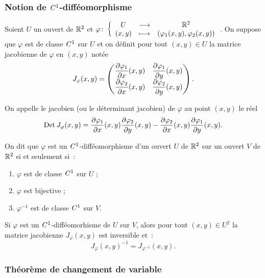 \subsubsection{Notion de $\mathit{C}^1$-difféomorphisme}

\begin{defdef}
  Soient $U$ un ouvert de $\mathbb{R}^2$ et $\varphi\colon \left\{\begin{array}{ccc} U & \longrightarrow &\mathbb{R}^2\\ (x,y) & \longmapsto & (\varphi_1(x,y),\varphi_2(x,y)) \end{array} \right.$. On suppose que $\varphi$ est de classe $\mathit{C}^1$ sur $U$ et on définit pour tout $(x,y) \in U$ la matrice jacobienne de $\varphi$ en $(x,y)$ notée
  \begin{equation}
    J_\varphi(x,y) = \begin{pmatrix} \dfrac{\partial \varphi_1}{\partial x}(x,y) & \dfrac{\partial \varphi_1}{\partial y}(x,y) \\ \dfrac{\partial \varphi_2}{\partial x}(x,y) & \dfrac{\partial \varphi_2}{\partial y}(x,y) \end{pmatrix}.
  \end{equation}

  On appelle le jacobien (ou le déterminant jacobien) de $\varphi$ au point $(x,y)$ le réel
  \begin{equation}
    \operatorname{Det} J_\varphi(x,y) = \dfrac{\partial \varphi_1}{\partial x}(x,y) \dfrac{\partial \varphi_2}{\partial y}(x,y) - \dfrac{\partial \varphi_2}{\partial x}(x,y) \dfrac{\partial \varphi_1}{\partial y}(x,y).
  \end{equation}
\end{defdef}
%
\begin{defdef}
  On dit que $\varphi$ est un $\mathit{C}^1$-difféomorphisme d'un ouvert $U$ de $\mathbb{R}^2$ sur un ouvert $V$ de $\mathbb{R}^2$ si et seulement si~:
  \begin{enumerate}
  \item $\varphi$ est de classe $\mathit{C}^1$ sur $U$ ;
  \item $\varphi$ est bijective ;
  \item $\varphi^{-1}$ est de classe $\mathit{C}^1$ sur $V$.
  \end{enumerate}
\end{defdef}
%
\begin{prop}[Admise]
  Si $\varphi$ est un $\mathit{C}^1$-difféomorhisme de $U$ sur $V$, alors pour tout $(x,y) \in U^2$ la matrice jacobienne $J_\varphi(x,y)$ est inversible et~:
  \begin{equation}
    J_\varphi(x,y)^{-1} = J_{\varphi^{-1}}(x,y).
  \end{equation}
\end{prop}

\subsubsection{Théorème de changement de variable}

